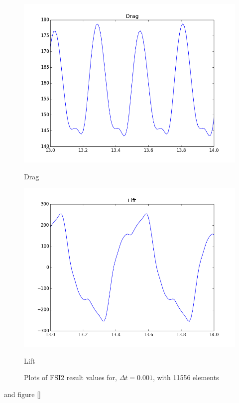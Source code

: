 \begin{figure}[H]
\begin{minipage}[b]{0.6\linewidth}
    \includegraphics[width=0.9\linewidth]{./Verification_Validation/Hron_Turek/FSI2_drag.png} 
    \caption{Drag} 
    \vspace{4ex}
  \end{minipage}%
  \begin{minipage}[b]{0.6\linewidth}
    \centering
    \includegraphics[width=0.9\linewidth]{./Verification_Validation/Hron_Turek/FSI2_lift.png} 
    \caption{Lift} 
    \vspace{4ex}
  \end{minipage} 
  \caption{Plots of FSI2 result values for, $\Delta t = 0.001$, with 11556 elements}
\end{figure}

 and figure \ref{}

